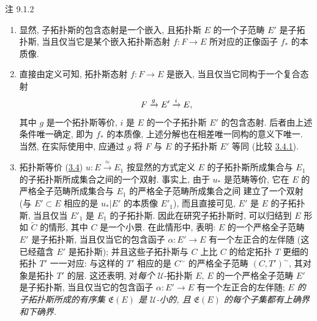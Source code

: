 \begin{enonce*}[remark]{注 9.1.2}
\begin{enumerate}
\renewcommand{\theenumi}{\alph{enumi}}
\renewcommand{\labelenumi}{\theenumi)}
\item 显然, 子拓扑斯的包含态射是一个嵌入,
且拓扑斯 $E$ 的一个子范畴 $E'$ 是子拓扑斯,
当且仅当它是某个嵌入拓扑斯态射 $f:F\rightarrow E$
所对应的正像函子 $f_{\ast}$ 的本质像.

\item 直接由定义可知, 拓扑斯态射 $f:F\rightarrow E$ 是嵌入,
当且仅当它同构于一个复合态射
$$
F\xrightarrow{g}E'\xrightarrow{i}E{},
$$
其中 $g$ 是一个拓扑斯等价,
$i$ 是 $E$ 的一个子拓扑斯 $E'$ 的包含态射.
后者由上述条件唯一确定, 即为 $f_{\ast}$ 的本质像,
上述分解也在相差唯一同构的意义下唯一.
当然, 在实际使用中, 应通过 $g$ 将 $F$ 与 $E$ 的子拓扑斯 $E'$ 等同
(比较 \hyperref[IV.subsubsec3.4.1]{3.4.1}).

\item 拓扑斯等价 (\hyperref[IV.subsec3.4]{3.4})
$u:E\xrightarrow{\approx}E_1$
按显然的方式定义 $E$ 的子拓扑斯所成集合与 $E_1$ 的子拓扑斯所成集合之间的一个双射.
事实上, 由于 $u_{\ast}$ 是范畴等价,
它在 $E$ 的严格全子范畴所成集合与 $E_1$ 的严格全子范畴所成集合之间
建立了\pageoriginale 一个双射
(与 $E'\subset E$ 相应的是 $u_{\ast}|E'$ 的本质像 $E'_1$),
而且直接可见, $E'$ 是 $E$ 的子拓扑斯,
当且仅当 $E'_1$ 是 $E_1$ 的子拓扑斯.
因此在研究子拓扑斯时, 可以归结到 $E$ 形如 $\widetilde{C}$ 的情形,
其中 $C$ 是一个小景.
在此情形中,  表明:
$E$ 的一个严格全子范畴 $E'$ 是子拓扑斯,
当且仅当它的包含函子 $\alpha:E'\rightarrow E$
有一个左正合的左伴随 (这已经蕴含 $E'$ 是拓扑斯);
并且这些子拓扑斯与 $C$ 上比 $C$ 的给定拓扑 $T$ 更细的拓扑 $T'$ 一一对应:
与这样的 $T'$ 相应的是 $C^{\sim}$ 的严格全子范畴 $(C,T')^{\sim}$,
其对象是拓扑 $T'$ 的层.
这还表明, 对\emph{每个} $𝒰$-拓扑斯 $E$,
$E$ 的一个严格全子范畴 $E'$ 是子拓扑斯,
当且仅当它的包含函子 $\alpha:E'\rightarrow E$ 有一个左正合的左伴随;
\emph{$E$ 的子拓扑斯所成的有序集 $\mathfrak{E}(E)$ 是 $𝒰$-小的,
且 $\mathfrak{E}(E)$ 的每个子集都有上确界和下确界.}


\end{enumerate}
\end{enonce*}
